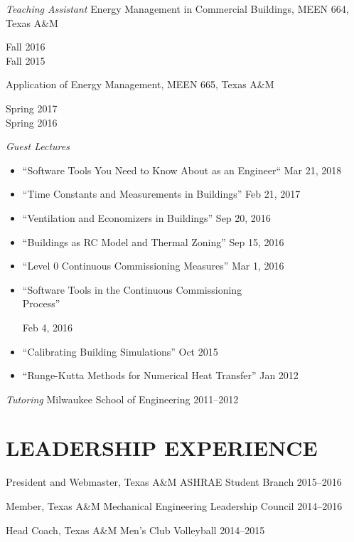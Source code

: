 \documentclass[margin]{res} %
\begin{document}
\begin{resume}
{\sl Teaching Assistant}\newline
Energy Management in Commercial Buildings, MEEN 664, Texas A\&M \hfill \parbox[t]{1.5cm}{\raggedleft Fall 2016 \\ Fall 2015} \par

\vspace{10pt}

Application of Energy Management, MEEN 665, Texas A\&M \hfill \parbox[t]{2cm}{\raggedleft Spring 2017 \\ Spring 2016}

\vspace{10pt}
{\sl Guest Lectures}
\begin{itemize}
    \item ``Software Tools You Need to Know About as an Engineer`` \hfill Mar 21, 2018
    \item ``Time Constants and Measurements in Buildings'' \hfill Feb 21, 2017
    \item ``Ventilation and Economizers in Buildings'' \hfill Sep 20, 2016
    \item ``Buildings as RC Model and Thermal Zoning'' \hfill Sep 15, 2016
    \item ``Level 0 Continuous Commissioning Measures'' \hfill Mar 1, 2016
    \item  \parbox{10cm}{``Software Tools in the Continuous Commissioning \\ Process''} \hfill Feb 4, 2016
    \item ``Calibrating Building Simulations'' \hfill Oct 2015
    \item ``Runge-Kutta Methods for Numerical Heat Transfer'' \hfill Jan 2012
\end{itemize}

\medskip


{\sl Tutoring} \newline
Milwaukee School of Engineering \hfill 2011--2012

\section{LEADERSHIP EXPERIENCE}

President and Webmaster, Texas A\&M ASHRAE Student Branch \hfill 2015--2016

Member, Texas A\&M Mechanical Engineering Leadership Council \hfill 2014--2016

Head Coach, Texas A\&M Men's Club Volleyball \hfill 2014--2015\


\end{resume}
\end{document}

